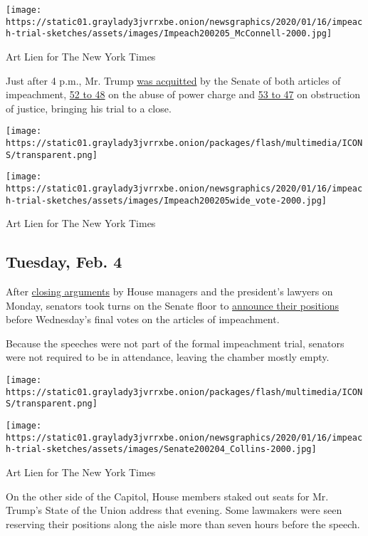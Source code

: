 \texttt{[image: https://static01.graylady3jvrrxbe.onion/newsgraphics/2020/01/16/impeach-trial-sketches/assets/images/Impeach200205\_McConnell-2000.jpg]}

Art Lien for The New York Times

Just after 4 p.m., Mr. Trump
\href{https://www.nytimes3xbfgragh.onion/2020/02/05/us/politics/trump-acquitted-impeachment.html}{was
acquitted} by the Senate of both articles of impeachment,
\href{https://www.nytimes3xbfgragh.onion/interactive/2020/02/05/us/politics/impeachment-vote-results.html}{52
to 48} on the abuse of power charge and
\href{https://www.nytimes3xbfgragh.onion/interactive/2020/02/05/us/politics/impeachment-vote-results.html}{53
to 47} on obstruction of justice, bringing his trial to a close.

\texttt{[image: https://static01.graylady3jvrrxbe.onion/packages/flash/multimedia/ICONS/transparent.png]}

\texttt{[image: https://static01.graylady3jvrrxbe.onion/newsgraphics/2020/01/16/impeach-trial-sketches/assets/images/Impeach200205wide\_vote-2000.jpg]}

Art Lien for The New York Times

\hypertarget{tuesday-feb-4}{%
\subsection{Tuesday, Feb. 4}\label{tuesday-feb-4}}

After
\href{https://www.nytimes3xbfgragh.onion/2020/02/03/us/politics/trump-impeachment-trial-final-arguments.html}{closing
arguments} by House managers and the president's lawyers on Monday,
senators took turns on the Senate floor to
\href{https://www.nytimes3xbfgragh.onion/2020/02/04/us/politics/senate-impeachment-vote.html}{announce
their positions} before Wednesday's final votes on the articles of
impeachment.

Because the speeches were not part of the formal impeachment trial,
senators were not required to be in attendance, leaving the chamber
mostly empty.

\texttt{[image: https://static01.graylady3jvrrxbe.onion/packages/flash/multimedia/ICONS/transparent.png]}

\texttt{[image: https://static01.graylady3jvrrxbe.onion/newsgraphics/2020/01/16/impeach-trial-sketches/assets/images/Senate200204\_Collins-2000.jpg]}

Art Lien for The New York Times

On the other side of the Capitol, House members staked out seats for Mr.
Trump's State of the Union address that evening. Some lawmakers were
seen reserving their positions along the aisle more than seven hours
before the speech.

